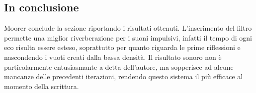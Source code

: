 \subsection{In conclusione}
Moorer conclude la sezione riportando i risultati ottenuti. L’inserimento del filtro permette una miglior riverberazione per i suoni impulsivi, infatti il tempo di ogni eco risulta essere esteso, soprattutto per quanto riguarda le prime riflessioni e nascondendo i vuoti creati dalla bassa densità.
Il risultato sonoro non è particolarmente entusiasmante a detta dell’autore, ma sopperisce ad alcune mancanze delle precedenti iterazioni, rendendo questo sistema il più efficace al momento della scrittura.